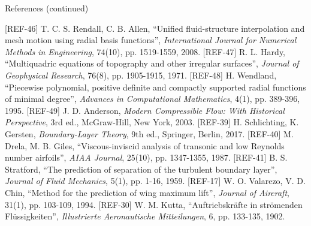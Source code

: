 \documentclass[aspectratio=169,11pt]{beamer}
\begin{document}
\begin{frame}{References (continued)}
\begin{reflist}
  \setcounter{enumi}{10}
   [REF-46] T. C. S. Rendall, C. B. Allen, ``Unified fluid-structure
        interpolation and mesh motion using radial basis functions'',
        \emph{International Journal for Numerical Methods in Engineering},
        74(10), pp. 1519-1559, 2008.
   [REF-47] R. L. Hardy, ``Multiquadric equations of topography and other
        irregular surfaces'', \emph{Journal of Geophysical Research}, 76(8),
        pp. 1905-1915, 1971.
   [REF-48] H. Wendland, ``Piecewise polynomial, positive definite and compactly
        supported radial functions of minimal degree'', \emph{Advances in
        Computational Mathematics}, 4(1), pp. 389-396, 1995.
   [REF-49] J. D. Anderson, \emph{Modern Compressible Flow: With Historical
        Perspective}, 3rd ed., McGraw-Hill, New York, 2003.
   [REF-39] H. Schlichting, K. Gersten, \emph{Boundary-Layer Theory}, 9th ed.,
        Springer, Berlin, 2017.
   [REF-40] M. Drela, M. B. Giles, ``Viscous-inviscid analysis of transonic and
        low Reynolds number airfoils'', \emph{AIAA Journal}, 25(10),
        pp. 1347-1355, 1987.
   [REF-41] B. S. Stratford, ``The prediction of separation of the turbulent
        boundary layer'', \emph{Journal of Fluid Mechanics}, 5(1), pp. 1-16,
        1959.
   [REF-17] W. O. Valarezo, V. D. Chin, ``Method for the prediction of wing
        maximum lift'', \emph{Journal of Aircraft}, 31(1), pp. 103-109, 1994.
   [REF-30] W. M. Kutta, ``Auftriebskr\"afte in str\"omenden Fl\"ussigkeiten'',
        \emph{Illustrierte Aeronautische Mitteilungen}, 6, pp. 133-135, 1902.
\end{reflist}
\end{frame}
\end{document}
